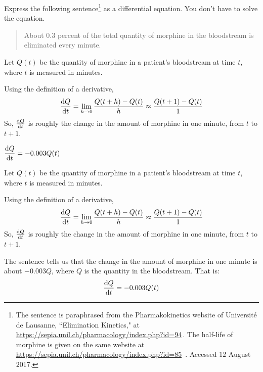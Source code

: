 \begin{question}
Express the following sentence\footnote{The sentence is paraphrased from
the Pharmakokinetics website of  Universit\'e de Lausanne,
``Elimination Kinetics," at \url{https://sepia.unil.ch/pharmacology/index.php?id=94}\,.
The half-life of morphine is given on the same website at \url{https://sepia.unil.ch/pharmacology/index.php?id=85}\ .
Accessed 12 August 2017.} as a differential equation. You don't have to solve the equation.
\begin{quote}
\color{blue}
About 0.3 percent of the total quantity of morphine in the bloodstream is eliminated every minute.
\end{quote}
\end{question}
\begin{hint}
Let $Q(t)$ be the quantity of morphine in a patient's bloodstream at time $t$, where $t$ is measured in minutes.

Using the definition of a derivative,
\[\diff{Q}{t}=\lim_{h \to 0}\frac{Q(t+h)-Q(t)}{h}\approx \frac{Q(t+1)-Q(t)}{1}\]
So, $\diff{Q}{t}$ is roughly the change in the amount of morphine in one minute, from $t$ to $t+1$.
\end{hint}
\begin{answer}
$\displaystyle \diff{Q}{t}=-0.003Q(t)$
\end{answer}
\begin{solution}
Let $Q(t)$ be the quantity of morphine in a patient's bloodstream at time $t$, where $t$ is measured in minutes.

Using the definition of a derivative,
\[\diff{Q}{t}=\lim_{h \to 0}\frac{Q(t+h)-Q(t)}{h}\approx \frac{Q(t+1)-Q(t)}{1}\]
So, $\diff{Q}{t}$ is roughly the change in the amount of morphine in one minute, from $t$ to $t+1$.

The sentence tells us that the change in the amount of morphine in one minute is about $-0.003Q$, where $Q$ is the quantity in the bloodstream. That is:
\[\diff{Q}{t}=-0.003Q(t)\]
\end{solution}

